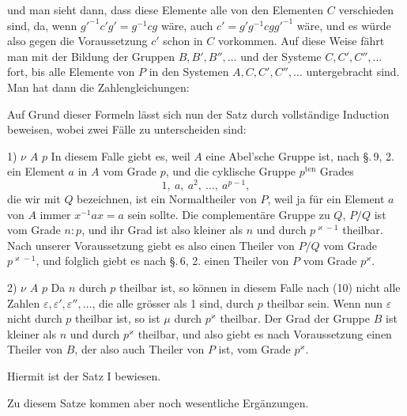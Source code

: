 und man sieht dann, dass diese Elemente alle von den Elementen $C$ verschieden sind, da, wenn $g'^{-1}c'g' = g^{-1}cg$ wäre, auch $c' = g'g^{-1}cgg'^{-1}$ wäre, und es würde also gegen die Voraussetzung $c'$ schon in $C$ vorkommen. Auf diese Weise fährt man mit der Bildung der Gruppen $B, B', B'', \ldots$ und der Systeme $C, C', C'', \ldots$ fort, bis alle Elemente von $P$ in den Systemen $A, C, C', C'', \ldots$ untergebracht sind. Man hat dann die Zahlengleichungen:

Auf Grund dieser Formeln lässt sich nun der  Satz durch vollständige Induction beweisen, wobei zwei Fälle zu unterscheiden sind:

1)  $\nu$  $A$  $p$  In diesem Falle giebt es, weil $A$ eine Abel'sche Gruppe ist, nach \S.\,9, 2. ein Element $a$ in $A$ vom Grade $p$, und die cyklische Gruppe $p^{\mathrm{ten}}$ Grades
\[ 1,\ a,\ a^2,\ \ldots,\ a^{p-1}, \]
die wir mit $Q$ bezeichnen, ist ein Normaltheiler von $P$, weil ja für ein Element $a$ von $A$ immer $x^{-1}ax = a$ sein sollte. Die complementäre Gruppe zu $Q$, $P/Q$ ist vom Grade $n:p$, und ihr Grad ist also kleiner als $n$ und durch $p^{\varkappa-1}$ theilbar. Nach unserer Voraussetzung giebt es also einen Theiler von $P/Q$ vom Grade $p^{\varkappa-1}$, und folglich giebt es nach \S.\,6, 2. einen Theiler von $P$ vom Grade $p^{\varkappa}$.

2)  $\nu$  $A$  $p$  Da $n$ durch $p$ theilbar ist, so können in diesem Falle nach (10) nicht alle Zahlen $\varepsilon, \varepsilon', \varepsilon'', \ldots$, die alle grösser als 1 sind, durch $p$ theilbar sein. Wenn nun $\varepsilon$ nicht durch $p$ theilbar ist, so ist $\mu$ durch $p^{\varkappa}$ theilbar. Der Grad der Gruppe $B$ ist kleiner als $n$ und durch $p^{\varkappa}$ theilbar, und also giebt es nach Voraussetzung einen Theiler von $B$, der also auch Theiler von $P$ ist, vom Grade $p^{\varkappa}$.

Hiermit ist der Satz I bewiesen.

Zu diesem Satze kommen aber noch wesentliche Ergänzungen.
